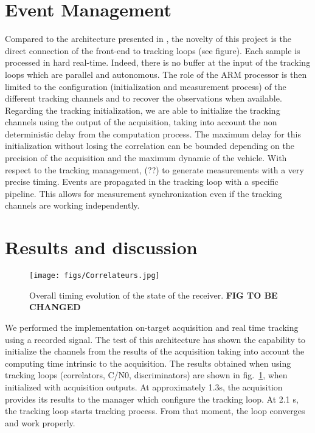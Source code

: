 \documentclass[conference]{IEEEtran}
\begin{document}
\section{Event Management}
Compared to the architecture presented in \cite{Maj18}, the novelty of this project is the direct connection of the front-end to tracking loops (see figure). Each sample is processed in hard real-time. Indeed, there is no buffer at the input of the tracking loops which are parallel and autonomous. The role of the ARM processor is then limited to the configuration (initialization and measurement process) of the different tracking channels and to recover the observations when available. Regarding the tracking initialization, we are able to initialize the tracking channels using the output of the acquisition, taking into account the non deterministic delay from the computation process. The maximum delay for this initialization without losing the correlation can be bounded depending on the precision of the acquisition and the maximum dynamic of the vehicle. With respect to the tracking management,  (??) to generate measurements with a very precise timing. Events are propagated in the tracking loop with a specific pipeline. This allows for measurement synchronization even if the tracking channels are working independently.


\section{Results and discussion}

 
\begin{figure}[!htbp]
\centerline{\texttt{[image: figs/Correlateurs.jpg]}}
\caption{Overall timing evolution of the state of the receiver. \textbf{FIG TO BE CHANGED}}
\label{fig:Overalltiming}
\end{figure}
We performed the implementation on-target acquisition and real time tracking using a recorded signal. The test of this architecture has shown the capability to initialize the channels from the results of the acquisition taking into account the computing time intrinsic to the acquisition. The results obtained when using tracking loops (correlators, C/N0, discriminators) are shown in fig.~\ref{fig:Overalltiming}, when initialized with acquisition outputs. At approximately 1.3s, the acquisition provides its results to the manager which configure the tracking loop. At 2.1 s, the tracking loop starts tracking process. From that moment, the loop converges and work properly.
\end{document}
